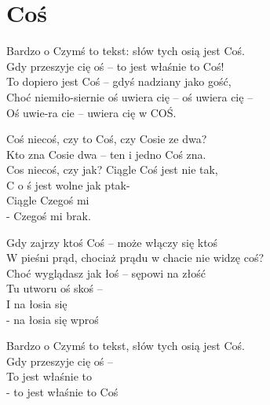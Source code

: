 \section{Coś}
\begin{text}
Bardzo o Czymś to tekst: słów tych osią jest Coś.\\
Gdy przeszyje cię oś – to jest właśnie to Coś!\\
To dopiero jest Coś – gdyś nadziany jako gość,\\
Choć niemiło-siernie oś uwiera cię – oś uwiera cię –\\
Oś uwie-ra cie – uwiera cię w COŚ.

Coś niecoś, czy to Coś, czy Cosie ze dwa?\\
Kto zna Cosie dwa – ten i jedno Coś zna.\\
Cos niecoś, czy jak? Ciągle Coś jest nie tak,\\
C o ś jest wolne jak ptak-\\
Ciągle Czegoś mi\\
- Czegoś mi brak.

Gdy zajrzy ktoś Coś – może włączy się ktoś\\
W pieśni prąd, chociaż prądu w chacie nie widzę coś?\\
Choć wyglądasz jak łoś – sępowi na złość\\
Tu utworu oś skoś –\\
I na łosia się\\
- na łosia się wproś

Bardzo o Czymś to tekst, słów tych osią jest Coś.\\
Gdy przeszyje cię oś –\\
To jest właśnie to\\
- to jest właśnie to Coś
\end{text}